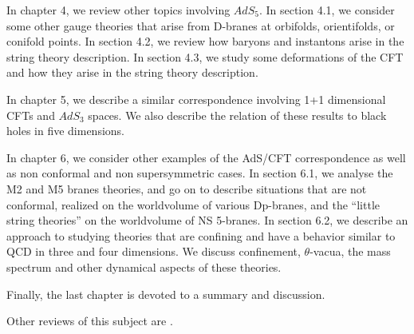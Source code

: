 In chapter 4, we review other topics involving $AdS_5$. 
In section 4.1, we consider some
other gauge theories that arise from D-branes at orbifolds, orientifolds,
or conifold points. In section 4.2,
we review  how baryons and instantons arise in the string theory
description. In section 4.3,
we study  some deformations of the CFT and how they arise in the
string theory description. 

In chapter 5, we describe a similar correspondence involving
1+1 dimensional CFTs and $AdS_3$ spaces. We also describe 
the relation of these results to black holes in five dimensions. 

In chapter 6, we consider  other examples of the 
AdS/CFT correspondence as well as non conformal and non supersymmetric
cases. In section 6.1, we analyse the M2 and M5 branes theories, 
and go on to describe situations that are not conformal, 
realized on the worldvolume
of various Dp-branes, and the ``little string theories'' on the
worldvolume of NS 5-branes.
In section 6.2, we describe an approach to studying theories
that are  confining and have a behavior similar
to QCD in three and four dimensions. We discuss confinement, $\theta$-vacua, 
the mass spectrum and other dynamical aspects of these theories. 

Finally, the last chapter is devoted to a summary and discussion.

Other reviews  of this subject are 
\cite{DiVecchia:1999du,Douglas:1999ww,Petersen:1999zh,Klebanov:1999ku}.







% 
